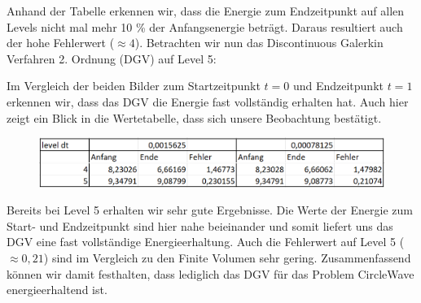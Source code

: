Anhand der Tabelle erkennen wir, dass die Energie zum Endzeitpunkt auf allen Levels nicht mal mehr 10 \% der Anfangsenergie beträgt. Daraus resultiert auch der hohe Fehlerwert ($\approx 4$). 
Betrachten wir nun das Discontinuous Galerkin Verfahren 2. Ordnung (DGV) auf Level 5:

\begin{figure}[H]
	\centering
\end{figure}

Im Vergleich der beiden Bilder zum Startzeitpunkt $t=0$ und Endzeitpunkt $t=1$ erkennen wir, dass das DGV die Energie fast vollständig erhalten hat. Auch hier zeigt ein Blick in die Wertetabelle, dass sich unsere Beobachtung bestätigt.

\begin{figure}[H]
	\centering
	\includegraphics[width=\textwidth]{../Aufgabe21/deg=2CircleWaveEnergieTabelle.png}
\end{figure}

Bereits bei Level 5 erhalten wir sehr gute Ergebnisse.
Die Werte der Energie zum Start- und Endzeitpunkt sind hier nahe beieinander und somit liefert uns das DGV eine fast vollständige Energieerhaltung. Auch die Fehlerwert auf Level 5 ($\approx 0,21$) sind im Vergleich zu den Finite Volumen sehr gering. Zusammenfassend können wir damit festhalten, dass lediglich das DGV für das Problem CircleWave energieerhaltend ist.


